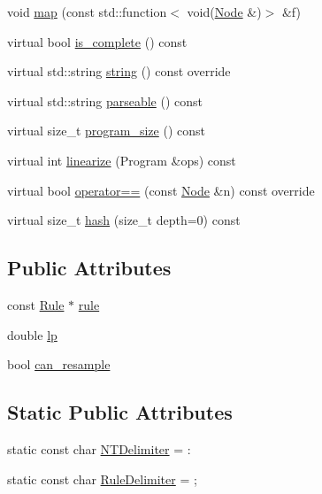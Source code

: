 \begin{DoxyCompactItemize}
\item 
void \hyperlink{class_node_adefac3cb7b411321c5af15dad1484834}{map} (const std\+::function$<$ void(\hyperlink{class_node}{Node} \&)$>$ \&f)
\item 
virtual bool \hyperlink{class_node_ac2e36754ba8b1b1d452deeb2bdbd346f}{is\+\_\+complete} () const
\item 
virtual std\+::string \hyperlink{class_node_a2c58ff9b0904718f568ac71f499cd17f}{string} () const override
\item 
virtual std\+::string \hyperlink{class_node_a70e879ceb71f47787137572d9bee8efa}{parseable} () const
\item 
virtual size\+\_\+t \hyperlink{class_node_a377548bcf1be99ac5181f9434c33c81e}{program\+\_\+size} () const
\item 
virtual int \hyperlink{class_node_a54676f34db2c299693c9b55148589230}{linearize} (Program \&ops) const
\item 
virtual bool \hyperlink{class_node_a8f42de356c047dd52472d24ace4d42c5}{operator==} (const \hyperlink{class_node}{Node} \&n) const override
\item 
virtual size\+\_\+t \hyperlink{class_node_a212f2e1ba4ff71de6954b0b791d89979}{hash} (size\+\_\+t depth=0) const
\end{DoxyCompactItemize}
\subsection*{Public Attributes}
\begin{DoxyCompactItemize}
\item 
const \hyperlink{class_rule}{Rule} $\ast$ \hyperlink{class_node_a02f5c9463cceb270ad5730760f19c722}{rule}
\item 
double \hyperlink{class_node_a298eaa3743b774a3f9ef396e1dc42a08}{lp}
\item 
bool \hyperlink{class_node_a98c14a51b240fbc7e438f40a12276257}{can\+\_\+resample}
\end{DoxyCompactItemize}
\subsection*{Static Public Attributes}
\begin{DoxyCompactItemize}
\item 
static const char \hyperlink{class_node_abd26102ffbe2a3e00c34bed5508b3234}{N\+T\+Delimiter} = \textquotesingle{}\+:\textquotesingle{}
\item 
static const char \hyperlink{class_node_ab58932e82964fb75ba806870c4069dc2}{Rule\+Delimiter} = \textquotesingle{};\textquotesingle{}
\end{DoxyCompactItemize}
